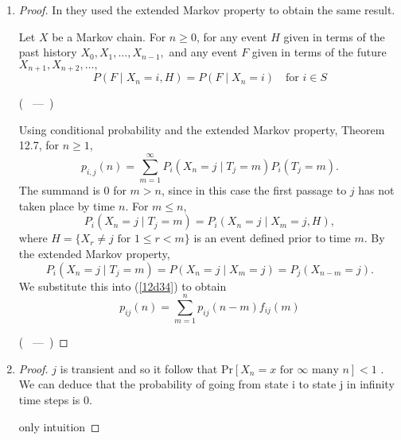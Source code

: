 \documentclass[a4paper, 11pt, oneside]{article}
\let\oldquote\quote
\let\endoldquote\endquote
\renewenvironment{quote}[2][]
  {\if\relax\detokenize{#1}\relax
     \def\quoteauthor{#2}%
   \else
     \def\quoteauthor{#2~---~#1}%
   \fi
   \oldquote}
  {\par\nobreak\smallskip\hfill(\quoteauthor)%
   \endoldquote\addvspace{\bigskipamount}}
\begin{document}
 \begin{enumerate}
 \item
\begin{proof}
In \cite[Theorem 12.33]{markov} they used the extended Markov property to obtain the same result.

\begin{quote}{\cite[Theorem 12.7]{markov} }{(Extended Markov prop)}
Let $X$ be a Markov chain. For $n \geq 0$, for any event $H$ given in terms of the past history $X_0, X_1, \ldots, X_{n-1},$ and any event $F$ given in terms of the future $X_{n+1}, X_{n+2}, \ldots,$
\begin{equation*}
P(F \mid X_n = i, H) = P(F \mid X_n = i) \quad \text{for } i \in S
\end{equation*} 
\end{quote}

\begin{quote}{\cite[Theorem 12.33]{markov} }{}
Using conditional probability and the extended Markov property, Theorem 12.7, for $n \geq 1$,
 \begin{equation}\label{12d34}
p_{i,j}(n) = \sum^{\infty}_{m=1}P_i (X_n = j \mid T_j = m)P_i(T_j =m).
\end{equation} 
The summand is 0 for $m > n$, since in this case the first passage to $j$ has not taken place by time $n$. For $m \leq n$, 
\begin{equation*} 
P_i(X_n = j \mid T_j=m)=P_i(X_n = j \mid X_m = j, H),
\end{equation*} 
where $H = \{X_r \neq j \text{ for } 1\leq r < m \}$ is an event defined prior to time $m$. By the extended Markov property,
\begin{equation*} 
P_i(X_n = j \mid T_j=m)=P(X_n = j \mid X_m = j) = P_j(X_{n-m}=j).
\end{equation*} 
We substitute this into (\ref{12d34}) to obtain
\begin{equation*} 
p_{ij}(n) = \sum_{m=1}^n p_{ij}(n-m) f_{ij}(m)
\end{equation*} 
\end{quote}
\end{proof}		

 \item
\begin{proof}
$j$ is transient and so it follow that Pr$[X_n = x\text{ for } \infty \text{ many } n] < 1$ \cite{markov_elad}. We can deduce that the probability of going from state i to state j in infinity time steps is 0.

{\tiny\color{red} only intuition}
\end{proof}		
  \end{enumerate}
  
\end{document}
